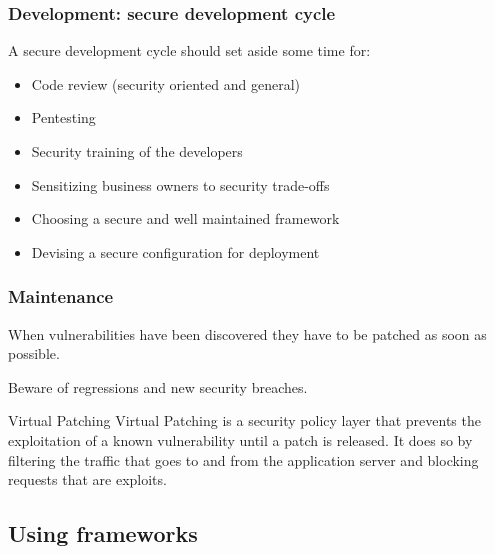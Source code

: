 \begin{frame}
\frametitle{Development: secure development cycle}
A secure development cycle should set aside some time for:
\begin{itemize}
\item Code review {\small (security oriented and general)}
\item Pentesting
\item Security training of the developers
\item Sensitizing business owners to security trade-offs
\item Choosing a secure and well maintained framework
\item Devising a secure configuration for deployment
\end{itemize}

\end{frame}

\begin{frame}
\frametitle{Maintenance}
When vulnerabilities have been discovered they have to be patched as soon as
possible.

Beware of regressions and new security breaches.

\begin{block}{Virtual Patching}
Virtual Patching is a security policy layer that prevents the exploitation of a known
vulnerability until a patch is released. It does so by filtering the
traffic that goes to and from the application server and blocking
requests that are exploits.
\end{block}

\end{frame}

\subsection{Using frameworks}

